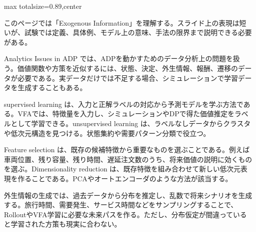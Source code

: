 \begin{minipage}[t]{0.58\textwidth}
\begin{adjustbox}{max totalsize={\textwidth}{0.89\textheight},center}
\begin{minipage}{\textwidth}\scriptsize
{}このページでは「Exogenous Information」を理解する。スライド上の表現は短いが、試験では定義、具体例、モデル上の意味、手法の限界まで説明できる必要がある。\par
Analytics Issues in ADP では、ADPを動かすためのデータ分析上の問題を扱う。価値関数や方策を近似するには、状態、決定、外生情報、報酬、遷移のデータが必要である。実データだけでは不足する場合、シミュレーションで学習データを生成することもある。\par
supervised learning は、入力と正解ラベルの対応から予測モデルを学ぶ方法である。VFAでは、特徴量を入力し、シミュレーションやDPで得た価値推定をラベルとして学習できる。unsupervised learning は、ラベルなしデータからクラスタや低次元構造を見つける。状態集約や需要パターン分類で役立つ。\par
Feature selection は、既存の候補特徴から重要なものを選ぶことである。例えば車両位置、残り容量、残り時間、遅延注文数のうち、将来価値の説明に効くものを選ぶ。Dimensionality reduction は、既存特徴を組み合わせて新しい低次元表現を作ることである。PCAやオートエンコーダのような方法が該当する。\par
外生情報の生成では、過去データから分布を推定し、乱数で将来シナリオを生成する。旅行時間、需要発生、サービス時間などをサンプリングすることで、RolloutやVFA学習に必要な未来パスを作る。ただし、分布仮定が間違っていると学習された方策も現実に合わない。\par

\end{minipage}
\end{adjustbox}
\end{minipage}
